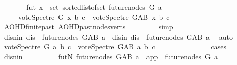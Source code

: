 \begin{isabellebody}
\ \ \ \ \isamarkupfalse%
\ \isamarkupfalse%
\ fut{\isacharcolon}{\kern0pt}\ {\isachardoublequoteopen}{\isasymforall}x\ {\isasymin}\ set\ {\isacharparenleft}{\kern0pt}sorted{\isacharunderscore}{\kern0pt}list{\isacharunderscore}{\kern0pt}of{\isacharunderscore}{\kern0pt}set\ {\isacharparenleft}{\kern0pt}future{\isacharunderscore}{\kern0pt}nodes\ G\ a{\isacharparenright}{\kern0pt}{\isacharparenright}{\kern0pt}{\isachardot}{\kern0pt}\ \isanewline
\ \ \ \ \ {\isacharparenleft}{\kern0pt}vote{\isacharunderscore}{\kern0pt}Spectre\ G\ x\ b\ c{\isacharparenright}{\kern0pt}\ {\isasymle}\ {\isacharparenleft}{\kern0pt}vote{\isacharunderscore}{\kern0pt}Spectre\ G{\isacharunderscore}{\kern0pt}AB\ x\ b\ c{\isacharparenright}{\kern0pt}{\isachardoublequoteclose}\isanewline
\ \ \ \ \ \ \isamarkupfalse%
\ AOHD{\isachardot}{\kern0pt}finite{\isacharunderscore}{\kern0pt}past\ AOHD{\isachardot}{\kern0pt}past{\isacharunderscore}{\kern0pt}nodes{\isacharunderscore}{\kern0pt}verts\ \isanewline
\ \ \ \ \ \ \isamarkupfalse%
\ simp\ \isanewline
\ \ \ \ \isamarkupfalse%
\ {\isacharparenleft}{\kern0pt}disnin{\isacharparenright}{\kern0pt}\ {\isachardoublequoteopen}dis\ {\isasymnotin}\ future{\isacharunderscore}{\kern0pt}nodes\ G{\isacharunderscore}{\kern0pt}AB\ a{\isachardoublequoteclose}\ {\isacharbar}{\kern0pt}\ {\isacharparenleft}{\kern0pt}disin{\isacharparenright}{\kern0pt}\ {\isachardoublequoteopen}dis\ {\isasymin}\ future{\isacharunderscore}{\kern0pt}nodes\ G{\isacharunderscore}{\kern0pt}AB\ a{\isachardoublequoteclose}\ \isamarkupfalse%
\ auto\isanewline
\ \ \ \ \isamarkupfalse%
\ \isamarkupfalse%
\ {\isachardoublequoteopen}vote{\isacharunderscore}{\kern0pt}Spectre\ G\ a\ b\ c\ {\isasymle}\ vote{\isacharunderscore}{\kern0pt}Spectre\ G{\isacharunderscore}{\kern0pt}AB\ a\ b\ c\ {\isachardoublequoteclose}\ \isanewline
\ \ \ \ \ \ \isamarkupfalse%
\ {}{\isacharparenleft}{\kern0pt}{}{\isacharparenright}{\kern0pt}\isanewline
\ \ \ \ \isamarkupfalse%
{\isacharparenleft}{\kern0pt}cases{\isacharparenright}{\kern0pt}\isanewline
\ \ \ \ \ \ \isamarkupfalse%
\ disnin\isanewline
\ \ \ \ \ \ \isamarkupfalse%
\ \isamarkupfalse%
\ futN{\isacharcolon}{\kern0pt}\ {\isachardoublequoteopen}future{\isacharunderscore}{\kern0pt}nodes\ G{\isacharunderscore}{\kern0pt}AB\ a\ {\isacharminus}{\kern0pt}\ {\isacharbraceleft}{\kern0pt}app{\isacharbraceright}{\kern0pt}\ {\isacharequal}{\kern0pt}\ future{\isacharunderscore}{\kern0pt}nodes\ G\ a{\isachardoublequoteclose}\isanewline

\end{isabellebody}
